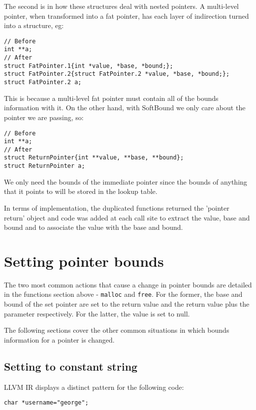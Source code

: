 The second is in how these structures deal with nested pointers.
A multi-level pointer, when transformed into a fat pointer, has each layer of indirection turned into a structure, eg:

\begin{verbatim}
// Before
int **a;
// After
struct FatPointer.1{int *value, *base, *bound;};
struct FatPointer.2{struct FatPointer.2 *value, *base, *bound;};
struct FatPointer.2 a;
\end{verbatim}

This is because a multi-level fat pointer must contain all of the bounds information with it.
On the other hand, with SoftBound we only care about the pointer we are passing, so:

\begin{verbatim}
// Before
int **a;
// After
struct ReturnPointer{int **value, **base, **bound};
struct ReturnPointer a;
\end{verbatim}

We only need the bounds of the immediate pointer since the bounds of anything that it points to will be stored in the lookup table.

In terms of implementation, the duplicated functions returned the 'pointer return' object and code was added at each call site to extract the value, base and bound and to associate the value with the base and bound.

\section{Setting pointer bounds}

The two most common actions that cause a change in pointer bounds are detailed in the functions section above - \verb!malloc! and \verb!free!.
For the former, the base and bound of the set pointer are set to the return value and the return value plus the parameter respectively.
For the latter, the value is set to null.

The following sections cover the other common situations in which bounds information for a pointer is changed.

\subsection{Setting to constant string}

LLVM IR displays a distinct pattern for the following code:

\begin{verbatim}
char *username="george";
\end{verbatim}

